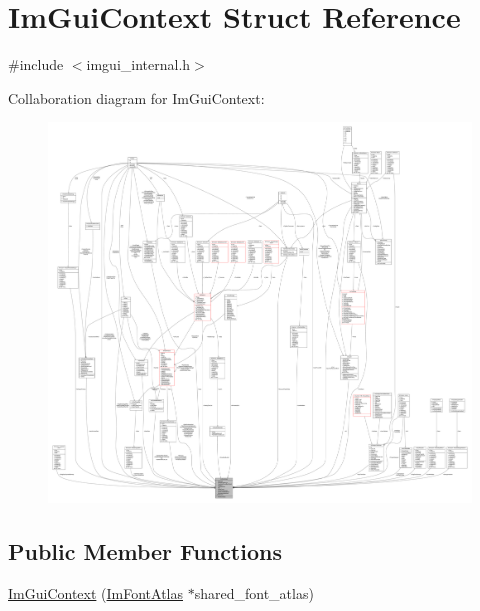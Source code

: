 \hypertarget{struct_im_gui_context}{}\section{Im\+Gui\+Context Struct Reference}
\label{struct_im_gui_context}


{\ttfamily \#include $<$imgui\+\_\+internal.\+h$>$}



Collaboration diagram for Im\+Gui\+Context\+:
\nopagebreak
\begin{figure}[H]
\begin{center}
\leavevmode
\includegraphics[width=350pt]{struct_im_gui_context__coll__graph}
\end{center}
\end{figure}
\subsection*{Public Member Functions}
\begin{DoxyCompactItemize}
\item 
\mbox{\hyperlink{struct_im_gui_context_a5842ccae7b18271370b6d5f7f698d8bd}{Im\+Gui\+Context}} (\mbox{\hyperlink{struct_im_font_atlas}{Im\+Font\+Atlas}} $\ast$shared\+\_\+font\+\_\+atlas)
\end{DoxyCompactItemize}
